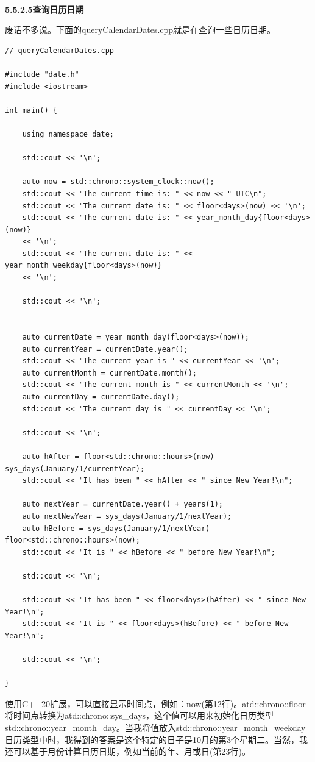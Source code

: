 \hspace*{\fill} \\ %
\noindent
\textbf{5.5.2.5\hspace{0.2cm}查询日历日期}

废话不多说。下面的queryCalendarDates.cpp就是在查询一些日历日期。

\begin{lstlisting}[style=styleCXX]
// queryCalendarDates.cpp

#include "date.h"
#include <iostream>

int main() {
	
	using namespace date;
	
	std::cout << '\n';
	
	auto now = std::chrono::system_clock::now();
	std::cout << "The current time is: " << now << " UTC\n";
	std::cout << "The current date is: " << floor<days>(now) << '\n';
	std::cout << "The current date is: " << year_month_day{floor<days>(now)}
	<< '\n';
	std::cout << "The current date is: " << year_month_weekday{floor<days>(now)}
	<< '\n';
	
	std::cout << '\n';
	
	
	auto currentDate = year_month_day(floor<days>(now));
	auto currentYear = currentDate.year();
	std::cout << "The current year is " << currentYear << '\n';
	auto currentMonth = currentDate.month();
	std::cout << "The current month is " << currentMonth << '\n';
	auto currentDay = currentDate.day();
	std::cout << "The current day is " << currentDay << '\n';
	
	std::cout << '\n';
	
	auto hAfter = floor<std::chrono::hours>(now) - sys_days(January/1/currentYear);
	std::cout << "It has been " << hAfter << " since New Year!\n";
	
	auto nextYear = currentDate.year() + years(1);
	auto nextNewYear = sys_days(January/1/nextYear);
	auto hBefore = sys_days(January/1/nextYear) - floor<std::chrono::hours>(now);
	std::cout << "It is " << hBefore << " before New Year!\n";
	
	std::cout << '\n';
	
	std::cout << "It has been " << floor<days>(hAfter) << " since New Year!\n";
	std::cout << "It is " << floor<days>(hBefore) << " before New Year!\n";
	
	std::cout << '\n';
	
}
\end{lstlisting}

使用C++20扩展，可以直接显示时间点，例如：now(第12行)。atd::chrono::floor将时间点转换为atd::chrono::sys\_days，这个值可以用来初始化日历类型std::chrono::year\_month\_day。当我将值放入std::chrono::year\_month\_weekday日历类型中时，我得到的答案是这个特定的日子是10月的第3个星期二。当然，我还可以基于月份计算日历日期，例如当前的年、月或日(第23行)。

